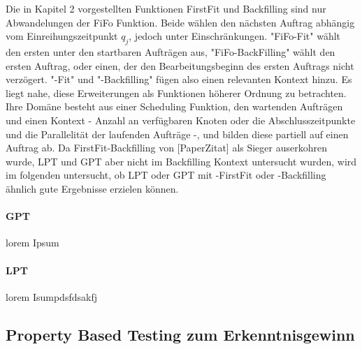 Die in Kapitel 2 vorgestellten Funktionen FirstFit und Backfilling sind nur Abwandelungen der FiFo Funktion. Beide wählen den nächsten Auftrag abhängig vom Einreihungszeitpunkt $q_j$, jedoch unter Einschränkungen. "FiFo-Fit" wählt den ersten unter den startbaren Aufträgen aus, "FiFo-BackFilling" wählt den ersten Auftrag, oder einen, der den Bearbeitungsbeginn des ersten Auftrags nicht verzögert. "-Fit" und "-Backfilling" fügen also einen relevanten Kontext hinzu. Es liegt nahe, diese Erweiterungen als Funktionen höherer Ordnung zu betrachten. Ihre Domäne besteht aus einer Scheduling Funktion, den wartenden Aufträgen und einen Kontext - Anzahl an verfügbaren Knoten oder die Abschlusszeitpunkte und die Parallelität der laufenden Aufträge -, und bilden diese partiell auf einen Auftrag ab. 
Da FirstFit-Backfilling von [PaperZitat] als Sieger auserkohren wurde, LPT und GPT aber nicht im Backfilling Kontext untersucht wurden, wird im folgenden untersucht, ob LPT oder GPT mit -FirstFit oder -Backfilling ähnlich gute Ergebnisse erzielen können.

\paragraph{GPT}
lorem Ipsum

\paragraph{LPT}
lorem Isumpdsfdsakfj



\subsection{Property Based Testing zum Erkenntnisgewinn}
\label{proptest}
